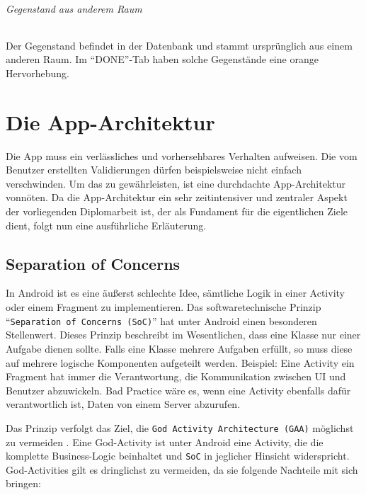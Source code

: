 \hypertarget{gegenstand-aus-anderem-raum}{%
\subparagraph{Gegenstand aus anderem
Raum}\label{gegenstand-aus-anderem-raum}}

Der Gegenstand befindet in der Datenbank und stammt ursprünglich aus
einem anderen Raum. Im ``DONE''-Tab haben solche Gegenstände eine orange
Hervorhebung.

\chapter{Die App-Architektur}
\label{die_app_architektur}

Die App muss ein verlässliches und vorhersehbares Verhalten aufweisen.
Die vom Benutzer erstellten Validierungen dürfen beispielsweise nicht
einfach verschwinden. Um das zu gewährleisten, ist eine durchdachte
App-Architektur vonnöten. Da die App-Architektur ein sehr zeitintensiver
und zentraler Aspekt der vorliegenden Diplomarbeit ist, der als
Fundament für die eigentlichen Ziele dient, folgt nun eine ausführliche
Erläuterung.

\hypertarget{separation-of-concerns}{%
\section{Separation of Concerns}\label{separation-of-concerns}}

In Android ist es eine äußerst schlechte Idee, sämtliche Logik in einer
Activity oder einem Fragment zu implementieren. Das softwaretechnische
Prinzip ``\texttt{Separation\ of\ Concerns\ (SoC)}'' hat unter Android
einen besonderen Stellenwert. Dieses Prinzip beschreibt im Wesentlichen,
dass eine Klasse nur einer Aufgabe dienen sollte. Falls eine Klasse
mehrere Aufgaben erfüllt, so muss diese auf mehrere logische Komponenten
aufgeteilt werden. Beispiel: Eine Activity \bzw ein Fragment hat immer
die Verantwortung, die Kommunikation zwischen UI und Benutzer
abzuwickeln. Bad Practice wäre es, wenn eine Activity ebenfalls dafür
verantwortlich ist, Daten von einem Server abzurufen.

Das Prinzip verfolgt das Ziel, die
\texttt{God\ Activity\ Architecture\ (GAA)} möglichst zu vermeiden
\cite{god-activities}. Eine God-Activity ist unter Android eine
Activity, die die komplette Business-Logic beinhaltet und \texttt{SoC}
in jeglicher Hinsicht widerspricht. God-Activities gilt es dringlichst
zu vermeiden, da sie folgende Nachteile mit sich bringen:


